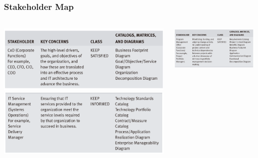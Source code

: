 \documentclass[aspectratio=169, table]{beamer}
\begin{document}
	{
		\begin{frame}
			\frametitle{Stakeholder Map}
			\framesubtitle{\hspace{1cm}}
			\begin{columns}
				\begin{column}{0.5\textwidth}
					\begin{center}
						\includegraphics[width=\textwidth]{../figures/stakeholder_map_1}
						\includegraphics[width=\textwidth]{../figures/stakeholder_map_3}
					\end{center}

				\end{column}
				\begin{column}{0.5\textwidth}
					\begin{center}
						\includegraphics[width=\textwidth]{../figures/stakeholder_map_2}
					\end{center}
				\end{column}
			\end{columns}

		\end{frame}
	}
\end{document}
